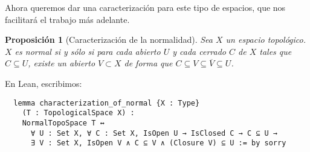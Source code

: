 \documentclass{article}
\newtheorem{proposition}{Proposición}[section]
\begin{document}
Ahora queremos dar una caracterización para este tipo de espacios, que nos facilitará el trabajo más adelante.

\begin{proposition}[Caracterización de la normalidad]
  Sea $X$ un espacio topológico. $X$ es normal si y sólo si para cada abierto $U$ y cada cerrado $C$ de $X$ tales que $C \subseteq U$, existe un abierto $V \subset X$ de forma que $C \subseteq V \subseteq \overline{V} \subseteq U$.
\end{proposition}

En Lean, escribimos:

\begin{lstlisting}
  lemma characterization_of_normal {X : Type}
    (T : TopologicalSpace X) :
    NormalTopoSpace T ↔
      ∀ U : Set X, ∀ C : Set X, IsOpen U → IsClosed C → C ⊆ U →
      ∃ V : Set X, IsOpen V ∧ C ⊆ V ∧ (Closure V) ⊆ U := by sorry
\end{lstlisting}
\end{document}

